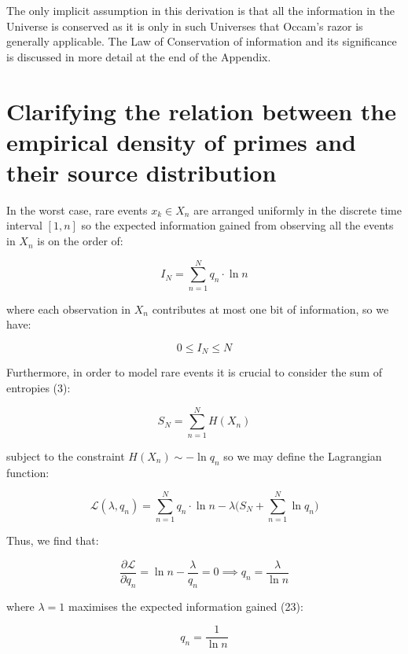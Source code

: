 \documentclass{article}
\begin{document}
The only implicit assumption in this derivation is that all the information in the Universe is conserved as it is only in such Universes that Occam's razor is generally applicable. The Law of Conservation of information and its significance is discussed in more detail at the end of the Appendix. 

\newpage

\section{Clarifying the relation between the empirical density of primes and their source distribution}

In the worst case, rare events $x_k \in X_n$ are arranged uniformly in the discrete time interval $[1,n]$ so the expected information gained from observing all the events in $X_n$ is on the order of: 

\begin{equation}
I_N = \sum_{n=1}^N q_n \cdot \ln n	
\end{equation}

where each observation in $X_n$ contributes at most one bit of information, so we have: 

\begin{equation}
0 \leq I_N \leq N	
\end{equation}

Furthermore, in order to model rare events it is crucial to consider the sum of entropies (3): 

\begin{equation}
S_N = \sum_{n=1}^N H(X_n)	
\end{equation}

subject to the constraint $H(X_n) \sim -\ln q_n$ so we may define the Lagrangian function: 

\begin{equation}
\mathcal{L}(\lambda, q_n) = \sum_{n=1}^N q_n \cdot \ln n - \lambda \big(S_N + \sum_{n=1}^N \ln q_n \big)	
\end{equation}

Thus, we find that: 

\begin{equation}
\frac{\partial \mathcal{L}}{\partial q_n} = \ln n - \frac{\lambda}{q_n} = 0 \implies q_n = \frac{\lambda}{\ln n}	
\end{equation}

where $\lambda = 1$ maximises the expected information gained (23): 

\begin{equation}
q_n = \frac{1}{\ln n}	
\end{equation}
\end{document}
